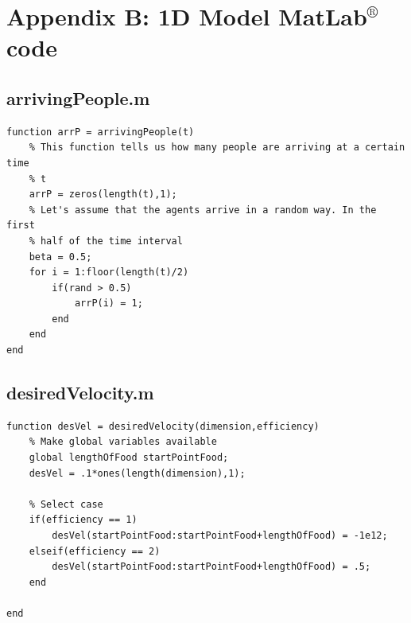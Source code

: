 \documentclass[11pt]{article}
\begin{document}
\newpage
\section{Appendix B: 1D Model MatLab$^{®}$ code}

\subsection*{arrivingPeople.m}
\begin{lstlisting}[frame=lines]
function arrP = arrivingPeople(t)
    % This function tells us how many people are arriving at a certain time
    % t
    arrP = zeros(length(t),1);
    % Let's assume that the agents arrive in a random way. In the first
    % half of the time interval
    beta = 0.5;
    for i = 1:floor(length(t)/2)
        if(rand > 0.5)
            arrP(i) = 1;
        end
    end
end
\end{lstlisting}

\subsection*{desiredVelocity.m}
\begin{lstlisting}[frame=lines]
function desVel = desiredVelocity(dimension,efficiency)
    % Make global variables available
    global lengthOfFood startPointFood;
    desVel = .1*ones(length(dimension),1);
    
    % Select case
    if(efficiency == 1)
        desVel(startPointFood:startPointFood+lengthOfFood) = -1e12;
    elseif(efficiency == 2)
        desVel(startPointFood:startPointFood+lengthOfFood) = .5;
    end

end
\end{lstlisting}
\end{document}
